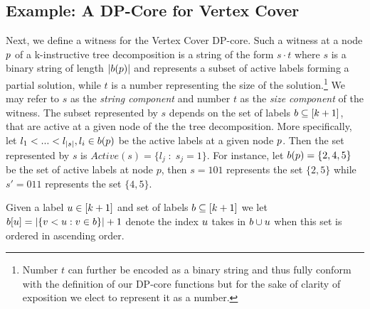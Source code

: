



\subsection{Example: A DP-Core for Vertex Cover}
\label{subsection:VC}


Next, we define a witness for the {\sc Vertex Cover} DP-core. Such a witness at a node $p$ of a k-instructive tree decomposition is a string of the form $ s\cdot t$ where $s$ is a binary string of length $|b(p)|$ and represents a subset of active labels forming a partial solution, while $t$ is a number representing the size of the solution.\footnote{Number $t$ can further be encoded as a binary string and thus fully conform with the definition of our DP-core functions but for the sake of clarity of exposition we elect to represent it as a number.} We may refer to $s$ as the \textit{string component} and number $t$ as the \textit{size component} of the witness. The subset represented by $s$ depends on the set of labels $b \subseteq [k+1]$, that are active at a given node of the the tree decomposition. More specifically, let $l_1 < ... < l_{|s|}, l_i \in b(p)$ be the active labels at a given node $p$. Then the set represented by $s$ is $Active(s) = \{l_j \;:\; s_j=1\}$. For instance, let
$b(p) = \{2,4,5\}$ be the set of active labels at node $p$, then $s=101$ represents the set $\{2,5\}$ while $s'=011$ represents the set $\{4,5\}$.  

Given a label $u \in [k+1]$ and set of labels $b \subseteq [k+1]$ we let $b[u] = |\{v < u : v \in b \}|+1$ denote the index $u$ takes in $b \cup u$ when this set is ordered in ascending order. 

